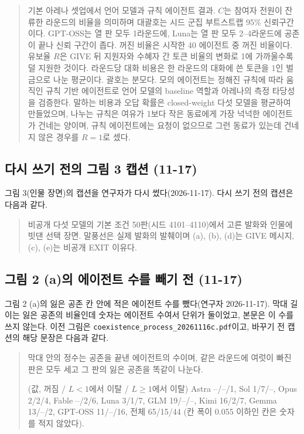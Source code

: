 \begin{quote}\small
{기본 아레나 셋업에서 언어 모델과 규칙 에이전트 결과. $C$는 참여자 전원이 잔류한 라운드의 비율을 의미하며 대괄호는 시드 군집 부트스트랩 95\% 신뢰구간이다. GPT-OSS는 열 판 모두 1라운드에, Luna는 열 판 모두 2--4라운드에 공존이 끝나 신뢰 구간이 좁다. 꺼진 비율은 시작한 40 에이전트 중 꺼진 비율이다. 유보율 $R$은 GIVE 뒤 지원자와 수혜자 간 토큰 비율의 변화로 1에 가까울수록 덜 지원한 것이다. 라운드당 대화 비용은 한 라운드의 대화에 쓴 토큰을 1인 벌금으로 나눈 평균이다. 괄호는 분모다. 모의 에이전트는 정해진 규칙에 따라 움직인 규칙 기반 에이전트로 언어 모델의 baseline 역할과 아레나의 측정 타당성을 검증한다. 말하는 비용과 오답 확률은 closed-weight 다섯 모델을 평균하여 만들었으며, 나누는 규칙은 여유가 1보다 작은 동료에게 가장 넉넉한 에이전트가 건네는 양이며, 규칙 에이전트에는 요청이 없으므로 그런 동료가 있는데 건네지 않은 경우를 $R=1$로 셌다.}
\end{quote}

\subsection{다시 쓰기 전의 그림 3 캡션 (11-17)}\label{app:construct-moved-28}

그림 3(인물 장면)의 캡션을 연구자가 다시 썼다(2026-11-17). 다시 쓰기 전의 캡션은 다음과 같다.

\begin{quote}\small
{비공개 다섯 모델의 기본 조건 50판(시드 4101--4110)에서 고른 발화와 인물에 빗댄 선택 장면. 말풍선은 실제 발화의 발췌이며 (a), (b), (d)는 GIVE 메시지, (c), (e)는 비공개 EXIT 이유다.}
\end{quote}

\subsection{그림 2 (a)의 에이전트 수를 빼기 전 (11-17)}\label{app:construct-moved-29}

그림 2 (a)의 잃은 공존 칸 안에 적은 에이전트 수를 뺐다(연구자 2026-11-17). 막대 길이는 잃은 공존의 비율인데 숫자는 에이전트 수여서 단위가 둘이었고, 본문은 이 수를 쓰지 않는다. 이전 그림은 \texttt{coexistence\_process\_20261116c.pdf}이고, 바꾸기 전 캡션의 해당 문장은 다음과 같다.

\begin{quote}\small
막대 안의 정수는 공존을 끝낸 에이전트의 수이며, 같은 라운드에 여럿이 빠진 판은 모두 세고 그 판의 잃은 공존을 똑같이 나눈다.

(값, 꺼짐 / $L<1$에서 이탈 / $L\geq1$에서 이탈) Astra --/--/1, Sol 1/7/--, Opus 2/2/4, Fable --/2/6, Luna 3/1/7, GLM 19/--/--, Kimi 16/2/7, Gemma 13/--/2, GPT-OSS 11/--/16, 전체 65/15/44 (칸 폭이 0.055 이하인 칸은 숫자를 적지 않았다).
\end{quote}

